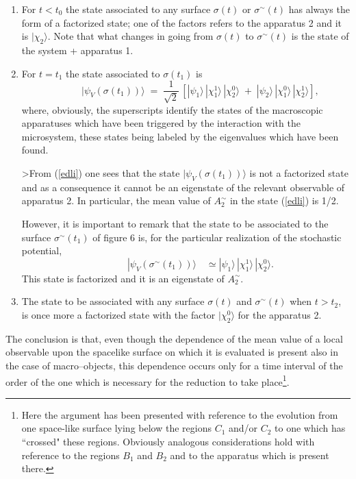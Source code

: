 \documentclass[12pt]{article}
\begin{document}
\begin{enumerate}
\item For $t < t_{0}$ the state associated to any surface $\sigma(t)$
or $\sigma^{\sim}(t)$ has always the form of a factorized state;
one of the factors refers to the apparatus 2 and it is
$|\chi_{2}\rangle$. Note that what changes in going from
$\sigma(t)$ to $\sigma^{\sim}(t)$ is the state of the system +
apparatus 1.

\item For $t = t_{1}$ the state associated to $\sigma(t_{1})$ is
\begin{equation} \label{edli}
\qquad\quad |\psi_{V}(\sigma(t_{1}))\rangle \; = \;
\frac{1}{\sqrt{2}}\, [|\psi_{1}\rangle\,
|\chi_{1}^{1}\rangle\,|\chi_{2}^{0}\rangle \; + \;
|\psi_{2}\rangle\, |\chi_{1}^{0}\rangle\, |\chi_{2}^{1}\rangle],
\end{equation}
where, obviously, the superscripts identify the states of the
macroscopic apparatuses which have been triggered by the
interaction with the microsystem, these states being labeled by
the eigenvalues which have been found.

>From (\ref{edli}) one sees that the state
$|\psi_{V}(\sigma(t_{1}))\rangle$ is not a factorized state and as
a consequence it cannot be an eigenstate of the relevant
observable of apparatus 2. In particular, the mean value of
$A_{2}^{\sim}$ in the state (\ref{edli}) is 1/2.

However, it is important to remark that the state to be associated
to the surface $\sigma^{\sim}(t_{1})$ of figure 6 is, for the
particular realization of the stochastic potential,
\begin{equation}
\qquad\quad |\psi_{V}(\sigma^{\sim}(t_{1}))\rangle \quad \simeq
|\psi_{1}\rangle\, |\chi_{1}^{1}\rangle\,|\chi_{2}^{0}\rangle.
\end{equation}
This state is factorized and it is an eigenstate of
$A_{2}^{\sim}$.
\item The state to be associated with any surface $\sigma(t)$ and
$\sigma^{\sim}(t)$ when $t > t_{2}$, is once more a factorized
state with the factor $|\chi_{2}^{0}\rangle$ for the apparatus 2.
\end{enumerate}
The conclusion is that, even though the dependence of the mean
value of a local observable upon the spacelike surface on which it
is evaluated is present also in the case of macro--objects, this
dependence occurs only for a time interval of the order of the one
which is necessary for the reduction to take place\footnote{Here the
argument has been presented with reference to the evolution from one
space-like surface lying below the regions $C_{1}$ and/or $C_{2}$ to one
which has ``crossed" these regions. Obviously analogous considerations
hold with reference to the regions $B_{1}$ and $B_{2}$ and to the
apparatus which is present there.}.
\end{document}
